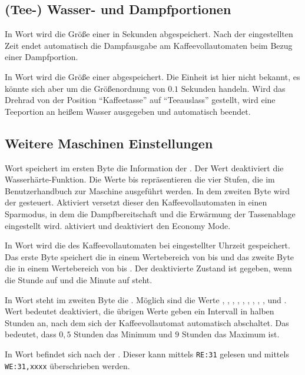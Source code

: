 \subsection{(Tee-) Wasser- und Dampfportionen}
In Wort  wird die Größe einer  in Sekunden abgespeichert.
Nach der eingestellten Zeit endet automatisch die Dampfausgabe am Kaffeevollautomaten beim Bezug einer Dampfportion.

In Wort  wird die Größe einer  abgespeichert.
Die Einheit ist hier nicht bekannt, es könnte sich aber um die Größenordnung von $0.1$ Sekunden handeln.
Wird das Drehrad von der Position "`Kaffeetasse"' auf "`Teeauslass"' gestellt, wird eine Teeportion an heißem Wasser ausgegeben und automatisch beendet.

\subsection{Weitere Maschinen Einstellungen}
Wort  speichert im ersten Byte die Information der .
Der Wert  deaktiviert die Wasserhärte-Funktion.
Die Werte  bis  repräsentieren die vier Stufen, die im Benutzerhandbuch zur Maschine ausgeführt werden.
In dem zweiten Byte wird der  gesteuert.
Aktiviert versetzt dieser den Kaffeevollautomaten in einen Sparmodus, in dem die Dampfbereitschaft und die Erwärmung der Tassenablage eingestellt wird.
 aktiviert und  deaktiviert den Economy Mode.

In Wort  wird die  des Kaffeevollautomaten bei eingestellter Uhrzeit gespeichert.
Das erste Byte speichert die  in einem Wertebereich von  bis  und das zweite Byte die  in einem Wertebereich von  bis .
Der deaktivierte Zustand ist gegeben, wenn die Stunde auf  und die Minute auf  steht.

In Wort  steht im zweiten Byte die .
Möglich sind die Werte , , , , , , , , ,  und .
Wert  bedeutet deaktiviert, die übrigen Werte geben ein Intervall in halben Stunden an, nach dem sich der Kaffeevollautomat automatisch abschaltet.
Das bedeutet, dass $0,5$ Stunden das Minimum und $9$ Stunden das Maximum ist.

In Wort  befindet sich nach \cite{GitCoffeeMachine} der .
Dieser kann mittels \texttt{RE:31} gelesen und mittels \texttt{WE:31,xxxx} überschrieben werden.

